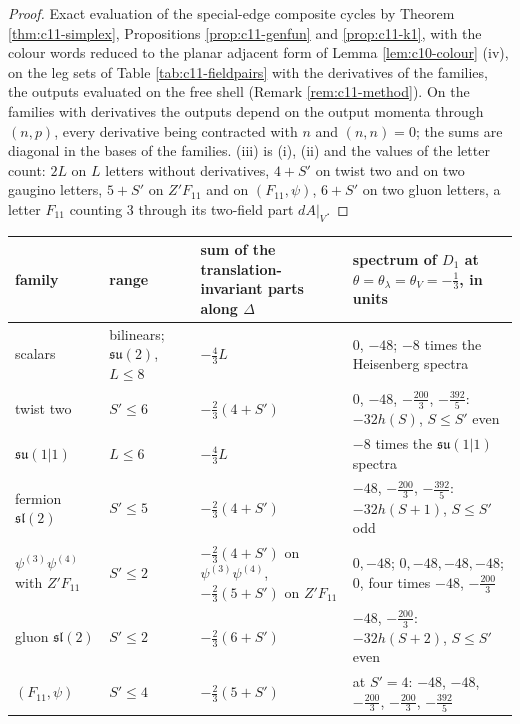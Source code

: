\begin{proof}
Exact evaluation of the special-edge composite cycles by Theorem \ref{thm:c11-simplex}, Propositions \ref{prop:c11-genfun} and \ref{prop:c11-k1}, with the colour words reduced to the planar adjacent form of Lemma \ref{lem:c10-colour} (iv), on the leg sets of Table \ref{tab:c11-fieldpairs} with the derivatives of the families, the outputs evaluated on the free shell (Remark \ref{rem:c11-method}). On the families with derivatives the outputs depend on the output momenta through $(n,p)$, every derivative being contracted with $n$ and $(n,n)=0$; the sums are diagonal in the bases of the families. (iii) is (i), (ii) and the values of the letter count: $2L$ on $L$ letters without derivatives, $4+S'$ on twist two and on two gaugino letters, $5+S'$ on $Z'F_{11}$ and on $(F_{11},\psi)$, $6+S'$ on two gluon letters, a letter $F_{11}$ counting $3$ through its two-field part $dA|_V$.
\end{proof}

\begin{tabular}{l|l|l|l}
family & range & sum of the translation-invariant parts along $\Delta$ & spectrum of $D_1$ at $\theta=\theta_\lambda=\theta_V=-\tfrac13$, in units\\
\hline
scalars & bilinears; $\mathfrak{su}(2)$, $L\le8$ & $-\tfrac43L$ & $0$, $-48$; $-8$ times the Heisenberg spectra\\
twist two & $S'\le6$ & $-\tfrac23(4+S')$ & $0$, $-48$, $-\tfrac{200}3$, $-\tfrac{392}5$: $-32h(S)$, $S\le S'$ even\\
$\mathfrak{su}(1|1)$ & $L\le6$ & $-\tfrac43L$ & $-8$ times the $\mathfrak{su}(1|1)$ spectra\\
fermion $\mathfrak{sl}(2)$ & $S'\le5$ & $-\tfrac23(4+S')$ & $-48$, $-\tfrac{200}3$, $-\tfrac{392}5$: $-32h(S+1)$, $S\le S'$ odd\\
$\psi^{(3)}\psi^{(4)}$ with $Z'F_{11}$ & $S'\le2$ & $-\tfrac23(4+S')$ on $\psi^{(3)}\psi^{(4)}$, $-\tfrac23(5+S')$ on $Z'F_{11}$ & $0,-48$; $0,-48,-48,-48$; $0$, four times $-48$, $-\tfrac{200}3$\\
gluon $\mathfrak{sl}(2)$ & $S'\le2$ & $-\tfrac23(6+S')$ & $-48$, $-\tfrac{200}3$: $-32h(S+2)$, $S\le S'$ even\\
$(F_{11},\psi)$ & $S'\le4$ & $-\tfrac23(5+S')$ & at $S'=4$: $-48$, $-48$, $-\tfrac{200}3$, $-\tfrac{200}3$, $-\tfrac{392}5$\\
\end{tabular}

